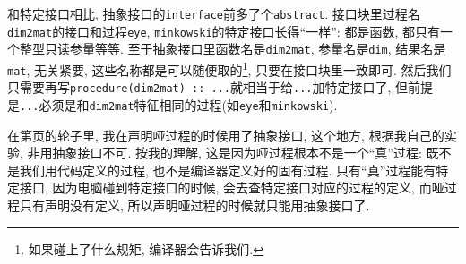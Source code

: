 和特定接口相比, 抽象接口的\verb|interface|前多了个\verb|abstract|. 接口块里过程名\verb|dim2mat|的接口和过程\verb|eye|, \verb|minkowski|的特定接口长得``一样'': 都是函数, 都只有一个整型只读参量等等. 至于抽象接口里函数名是\verb|dim2mat|, 参量名是\verb|dim|, 结果名是\verb|mat|, 无关紧要, 这些名称都是可以随便取的\footnote{如果碰上了什么规矩, 编译器会告诉我们.}, 只要在接口块里一致即可. 然后我们只需要再写\verb|procedure(dim2mat) :: ...|就相当于给\verb|...|加特定接口了, 但前提是\verb|...|必须是和\verb|dim2mat|特征相同的过程(如\verb|eye|和\verb|minkowski|).

在第\pageref{dummy_procedure_program}页的轮子里, 我在声明哑过程的时候用了抽象接口, 这个地方, 根据我自己的实验, 非用抽象接口不可. 按我的理解, 这是因为哑过程根本不是一个``真''过程: 既不是我们用代码定义的过程, 也不是编译器定义好的固有过程. 只有``真''过程能有特定接口, 因为电脑碰到特定接口的时候, 会去查特定接口对应的过程的定义, 而哑过程只有声明没有定义, 所以声明哑过程的时候就只能用抽象接口了.
